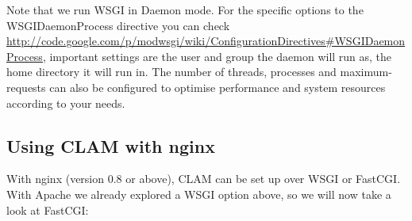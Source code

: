\documentclass[a4paper,12pt]{report}
\begin{document}
Note that we run WSGI in Daemon mode. For the specific options to the WSGIDaemonProcess directive you can check \url{http://code.google.com/p/modwsgi/wiki/ConfigurationDirectives\#WSGIDaemonProcess}, important settings are the user and group the daemon will run as, the home directory it will run in. The number of threads, processes and maximum-requests can also be configured to optimise performance and system resources according to your needs.


\subsection{Using CLAM with nginx}

With nginx (version 0.8 or above), CLAM can be set up over WSGI or FastCGI. With Apache we already explored a WSGI option above, so we will now take a look at FastCGI:
\end{document}
